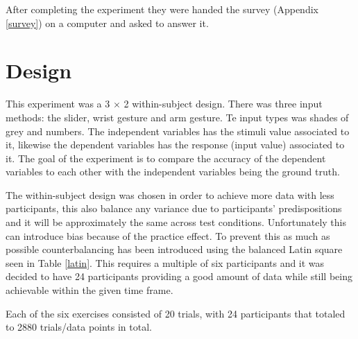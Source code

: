 After completing the experiment they were handed the survey (Appendix \ref{survey}) on a computer and asked to answer it. 

\section{Design}
This experiment was a 3 $\times$ 2 within-subject design. There was three input methods: the slider, wrist gesture and arm gesture. Te input types was shades of grey and numbers. The independent variables has the stimuli value associated to it, likewise the dependent variables has the response (input value) associated to it. The goal of the experiment is to compare the accuracy of the dependent variables to each other with the independent variables being the ground truth.

The within-subject design was chosen in order to achieve more data with less participants, this also balance any variance due to participants’ predispositions and it will be approximately the same across test conditions. Unfortunately this can introduce bias because of the practice effect. To prevent this as much as possible counterbalancing has been introduced using the balanced Latin square seen in Table \ref{latin}. This requires a multiple of six participants and it was decided to have 24 participants providing a good amount of data while still being achievable within the given time frame.

Each of the six exercises consisted of 20 trials, with 24 participants that totaled to 2880 trials/data points in total.


